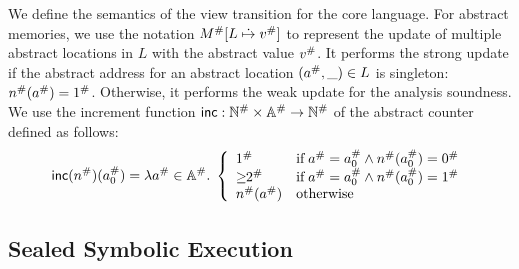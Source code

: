 We define the semantics of the view transition for the core language.  For abstract
memories, we use the notation ${M}^{\#}[L \;\dot{\mapsto}\; {v}^{\#}]$ to represent the
update of multiple abstract locations in $L$ with the abstract value ${v}^{\#}$.
It performs the strong update if the abstract address for an abstract location
$({a}^{\#}, \_) \in L$ is singleton: ${n}^{\#}({a}^{\#}) = {1}^{\#}$.
Otherwise, it performs the weak update for the analysis soundness.  We use
the increment function $\textsf{inc}: {\mathbb{N}}^{\#} \times {\mathbb{A}}^{\#} \rightarrow
{\mathbb{N}}^{\#}$ of the abstract counter defined as follows:
\[
  \textsf{inc}({n}^{\#})({a}^{\#}_0) = \lambda {a}^{\#} \in {\mathbb{A}}^{\#}. \; \left\{
    \begin{array}{ll}
      {1}^{\#} & \text{if} \; {a}^{\#} = {a}^{\#}_0 \wedge
      {n}^{\#}({a}^{\#}_0) = {0}^{\#}\\
      {\geq\!\!2}^{\#} & \text{if} \; {a}^{\#} = {a}^{\#}_0 \wedge
      {n}^{\#}({a}^{\#}_0) = {1}^{\#}\\
      {n}^{\#}({a}^{\#}) & \text{otherwise}
    \end{array}
  \right.
\]


\subsection{Sealed Symbolic Execution}

